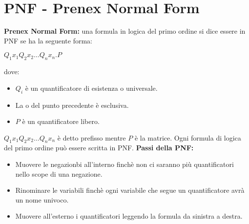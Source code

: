 \documentclass[../main.tex]{subfiles}
\newcommand{\spazio}{\vspace{1em} \newline}
\begin{document}
   \section{PNF - Prenex Normal Form}
   \textbf{Prenex Normal Form:} una formula in logica del primo ordine si dice essere in PNF se ha la seguente forma:
   \begin{center}
      $Q_1 x_1 Q_2 x_2 \dots Q_n x_n .P$
   \end{center}
   dove:
   \begin{itemize}
      \item $Q_i$ è un quantificatore di esistenza o universale.
      \item La o del punto precedente è esclusiva.
      \item $P$ è un quantificatore libero.
   \end{itemize}
   $Q_1 x_1 Q_2 x_2 \dots Q_n x_n$ è detto prefisso mentre $P$ è la matrice.
   \spazio
   Ogni formula di logica del primo ordine può essere scritta in PNF.
   \spazio
   \textbf{Passi della PNF:}
   \begin{itemize}
      \item Muovere le negazionbi all'interno finchè non ci saranno più quantificatori nello scope di una negazione.
      \item Rinominare le variabili finchè ogni variabile che segue un quantificatore avrà un nome univoco.
      \item Muovere all'esterno i quantificatori leggendo la formula da sinistra a destra.
   \end{itemize}
\end{document}
